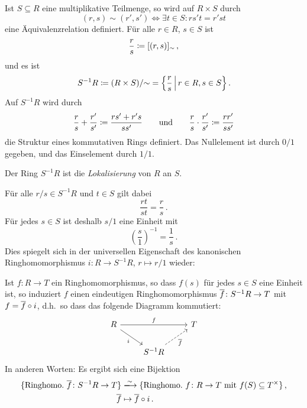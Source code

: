 Ist $S \subseteq R$ eine multiplikative Teilmenge, so wird auf $R \times S$ durch
\begin{equation}
\label{equation: formula for localization}
        (r,s) \sim (r', s')
  \iff  \exists t \in S:
        rs't = r'st
\end{equation}
eine Äquivalenzrelation definiert.
Für alle $r \in R$, $s \in S$ ist
\[
            \frac{r}{s}
  \coloneqq  [(r,s)]_{\sim} \,,
\]
und es ist
\[
            S^{-1} R
  \defined  (R \times S)/{\sim}
  =         \left\{
              \frac{r}{s}
            \suchthat*
              r \in R,
              s \in S
            \right\}.
\]
Auf $S^{-1} R$ wird durch
\[
              \frac{r}{s}
            + \frac{r'}{s'}
  \coloneqq  \frac{rs' + r's}{ss'}
  \qquad\text{und}\qquad
                  \frac{r}{s}
            \cdot \frac{r'}{s'}
  \coloneqq  \frac{rr'}{ss'}
\]
die Struktur eines kommutativen Rings definiert.
Das Nullelement ist durch $0/1$ gegeben, und das Einselement durch $1/1$.

\begin{definition}
  Der Ring $S^{-1} R$ ist die \emph{Lokalisierung} von $R$ an $S$.
\end{definition}


Für alle $r/s \in S^{-1} R$ und $t \in S$ gilt dabei
\[
    \frac{rt}{st}
  = \frac{r}{s} \,.
\]
Für jedes $s \in S$ ist deshalb $s/1$ eine Einheit mit
\[
    \left( \frac{s}{1} \right)^{-1}
  = \frac{1}{s} \,.
\]
Dies spiegelt sich in der universellen Eigenschaft des kanonischen Ringhomomorphismus $i \colon R \to S^{-1} R$, $r \mapsto r/1$ wieder:

\begin{theorem}
  Ist $f \colon R \to T$ ein Ringhomomorphismus, so dass $f(s)$ für jedes $s \in S$ eine Einheit ist, so induziert $f$ einen eindeutigen Ringhomomorphismus $\overline{f} \colon S^{-1} R \to T$ mit $f = \overline{f} \circ i$, d.h.\ so dass das folgende Diagramm kommutiert:
  \[
    \begin{tikzcd}
        R
        \arrow{rr}[above]{f}
        \arrow{dr}[below left]{i}
      & {}
      & T
      \\
        {}
      & S^{-1} R
        \arrow[dashed]{ur}[below right]{\induced{f}}
      & {}
    \end{tikzcd}
  \]
  In anderen Worten:
  Es ergibt sich eine Bijektion
  \begin{align*}
                            \{ \text{Ringhomo.\ $\induced{f} \colon S^{-1} R \to T$} \}
    &\xlongrightarrow{\sim} \{ \text{Ringhomo.\ $f \colon R \to T$ mit $f(S) \subseteq \unitgroup{T}$} \} \,,  \\
                            \induced{f}
    &\mapsto                \induced{f} \circ i \,.
  \end{align*}
\end{theorem}

